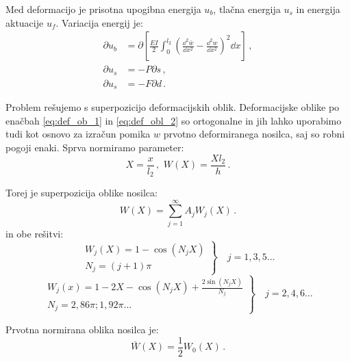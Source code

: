         Med deformacijo je prisotna upogibna energija $u_b$, tlačna energija $u_s$ in energija aktuacije $u_f$. Variacija energij je: 
        \begin{align}\label{eq:variacija_energij}
            \partial u_b &= \partial\left[\frac{E I}{2} \int_0^{l_2}\left(\frac{\dd^2 \bar{w}}{\dd x^2}-\frac{\dd^2 w}{\dd x^2}\right)^2 \dd x\right] \,,\\
            \partial u_s &= -P \partial s \,,\\
            \partial u_s &= -F \partial d \,.
        \end{align}
        
        Problem rešujemo s superpozicijo deformacijskih oblik. Deformacijske oblike po enačbah \eqref{eq:def_ob_1} in \eqref{eq:def_obl_2} so ortogonalne in jih lahko uporabimo tudi kot osnovo za izračun pomika $w$ prvotno deformiranega nosilca, saj so robni pogoji enaki. Sprva normiramo parameter:
        \begin{equation}
            X = \frac{x}{l_2} \,, \,\, W(X)=\frac{X l_2}{h}  \, .
        \end{equation}
        
        Torej je superpozicija oblike nosilca: 
        \begin{equation}
            W(X) = \sum_{j=1}^{\infty} A_j W_j(X) \,.
        \end{equation}
        in obe rešitvi:
        \begin{equation}
            \left.\begin{array}{l}
            W_j(X)=1-\cos \left(N_j X\right) \\
            N_j=(j+1) \pi
            \end{array}\right\} \quad j=1, 3, 5 \ldots
        \end{equation}
        \begin{equation}
            \left.\begin{array}{l}
            W_j(x)=1-2 X-\cos \left(N_j X\right)+\frac{2 \sin \left(N_j X\right)}{N_j} \\
            N_j=2,86 \pi; 1,92 \pi \ldots
            \end{array}\right\} \quad j = 2, 4, 6 \ldots
        \end{equation}
        
        Prvotna normirana oblika nosilca je: 
        \begin{equation}
            \bar{W}(X)=\frac{1}{2} W_0(X) \,.
        \end{equation}
        
